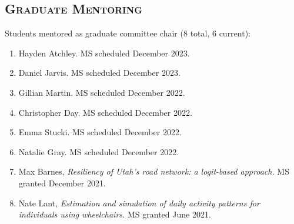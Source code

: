 \documentclass[margin,line]{res}
\newcounter{enuminitialize}
\newenvironment{myenum}[1][]
{%
 \setcounter{enuminitialize}{#1}
 \addtocounter{enuminitialize}{2}
 \begin{enumerate}[left= 4pt, itemsep=12pt, start=\value{enuminitialize}, label=\arabic*\addtocounter{enumi}{-2}]
}
{%
 \end{enumerate}
}
\newcommand{\secfont}{\scshape }
\begin{document}
\begin{resume}
\section{\secfont Graduate Mentoring}
Students mentored as graduate committee chair (8 total, 6 current):
\vspace{0.3cm}
\begin{myenum}[8]
  \item Hayden Atchley. MS scheduled December 2023.
  \item Daniel Jarvis. MS scheduled December 2023.
  \item Gillian Martin. MS scheduled December 2022.
  \item Christopher Day. MS scheduled December 2022.
  \item Emma Stucki. MS scheduled December 2022.
  \item Natalie Gray. MS scheduled December 2022.
  \item Max Barnes, \textit{Resiliency of Utah's road network: a logit-based approach.} MS granted December 2021.
  \item Nate Lant, \textit{Estimation and simulation of daily activity patterns for individuals using wheelchairs.} MS granted June 2021.
\end{myenum}


\end{resume}
\end{document}
